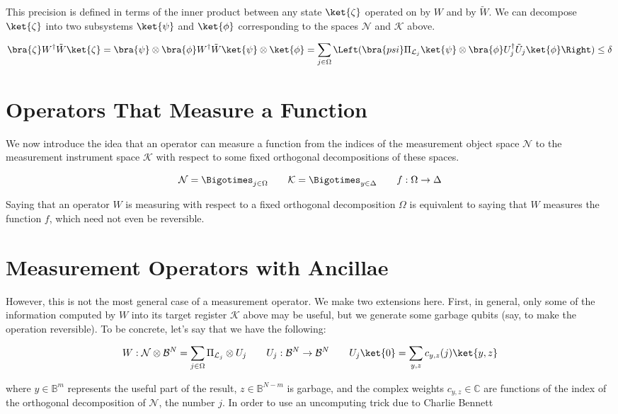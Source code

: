 \documentclass{article}
\begin{document}
This precision is defined in terms of the inner product between any state
$\ket{\zeta}$
operated
on by $W$ and by $\tilde{W}$. We can decompose $\ket{\zeta}$ into
two subsystems $\ket{\psi}$ and $\ket{\phi}$
corresponding to the spaces $\mathcal{N}$ and $\mathcal{K}$
above.

\begin{equation}
\bra{\zeta} W^{\dag} \tilde{W} \ket{\zeta} =
\bra{\psi} \otimes \bra{\phi} W^{\dag} \tilde{W} \ket{\psi} \otimes \ket{\phi} =
\sum_{j \in \Omega} \Left( \bra{psi} \Pi_{\mathcal{L}_j} \ket{\psi} \otimes
\bra{\phi} U^{\dag}_j \tilde{U}_j \ket{\phi} \Right) \le \delta
\end{equation}

\section{Operators That Measure a Function}

We now introduce the idea that an operator can measure a function
from the indices of the measurement object space $\mathcal{N}$
to the measurement instrument space $\mathcal{K}$ with respect to
some fixed orthogonal decompositions of these spaces.

\begin{equation}
\mathcal{N} = \Bigotimes_{j \in \Omega} \qquad
\mathcal{K} = \Bigotimes_{y \in \Delta} \qquad
f:\Omega \rightarrow \Delta
\end{equation}

Saying that an operator $W$ is measuring with respect to a fixed
orthogonal decomposition $\Omega$ is equivalent to saying that
$W$ measures the function $f$, which need not even be reversible.

\section{Measurement Operators with Ancillae}

However, this is not the most general case of a measurement operator.
We make two extensions here.
First, in general, only some of the information computed by $W$ into its
target register $\mathcal{K}$ above may be useful, but we generate some
garbage qubits (say, to make the operation reversible).
To be concrete, let's
say that we have the following:

\begin{equation}
W: \mathcal{N} \otimes \mathcal{B}^N =
\sum_{j \in \Omega} \Pi_{\mathcal{L}_j} \otimes U_j \qquad
U_j : \mathcal{B}^N \rightarrow \mathcal{B}^N \qquad
U_j\ket{0} = \sum_{y,z} c_{y,z}(j)\ket{y,z}
\end{equation}

where $y \in \mathbb{B}^m$ represents the useful part of the result,
$z \in \mathbb{B}^{N-m}$ is garbage, and the complex weights
$c_{y,z} \in \mathbb{C}$
are functions of the index of the orthogonal decomposition of $\mathcal{N}$,
the number $j$. In order to use an uncomputing trick due to Charlie Bennett




\end{document}
